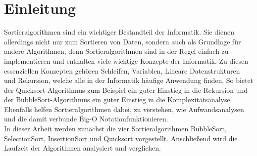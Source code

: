 \documentclass[./entry.tex]{subfiles}
\begin{document}
    \chapter{Einleitung}

    Sortieralgorithmen sind ein wichtiger Bestandteil der Informatik.
    Sie dienen allerdings nicht nur zum Sortieren von Daten,
    sondern auch als Grundlage für andere Algorithmen,
    denn Sortieralgorithmen sind in der Regel einfach zu implementieren
    und enthalten viele wichtige Konzepte der Informatik.
    Zu diesen essenziellen Konzepten gehören Schleifen,
    Variablen, Lineare Datenstrukturen und Rekursion, welche
    alle in der Informatik häufige Anwendung finden.
    So bietet der Quicksort-Algorithmus zum Beispiel ein guter Einstieg in die Rekursion
    und der BubbleSort-Algorithmus ein guter Einstieg in die Komplexitätsanalyse.
    Ebenfalls helfen Sortieralgorithmen dabei, zu verstehen,
    wie Aufwandsanalysen und die damit verbunde \dq Big-O Notation\dq funktionieren. \\

    In dieser Arbeit werden zunächst die vier Sortieralgorithmen BubbleSort, SelectionSort, InsertionSort und Quicksort vorgestellt.
    Anschließend wird die Laufzeit der Algorithmen analysiert und verglichen.
\end{document}

